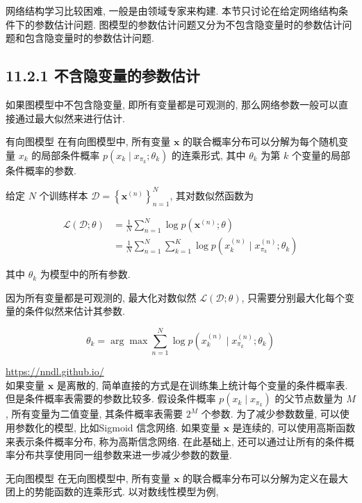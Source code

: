 \documentclass[10pt]{article}
\begin{document}
网络结构学习比较困难, 一般是由领域专家来构建. 本节只讨论在给定网络结构条件下的参数估计问题. 图模型的参数估计问题又分为不包含隐变量时的参数估计问题和包含隐变量时的参数估计问题.

\subsection*{11.2.1 不含隐变量的参数估计}
如果图模型中不包含隐变量, 即所有变量都是可观测的, 那么网络参数一般可以直接通过最大似然来进行估计.

有向图模型 在有向图模型中, 所有变量 $\boldsymbol{x}$ 的联合概率分布可以分解为每个随机变量 $x_{k}$ 的局部条件概率 $p\left(x_{k} \mid x_{\pi_{k}} ; \theta_{k}\right)$ 的连乘形式, 其中 $\theta_{k}$ 为第 $k$ 个变量的局部条件概率的参数.

给定 $N$ 个训练样本 $\mathcal{D}=\left\{\boldsymbol{x}^{(n)}\right\}_{n=1}^{N}$, 其对数似然函数为


\begin{align*}
\mathcal{L}(\mathcal{D} ; \theta) & =\frac{1}{N} \sum_{n=1}^{N} \log p\left(\boldsymbol{x}^{(n)} ; \theta\right)  \tag{11.27}\\
& =\frac{1}{N} \sum_{n=1}^{N} \sum_{k=1}^{K} \log p\left(x_{k}^{(n)} \mid x_{\pi_{k}}^{(n)} ; \theta_{k}\right) \tag{11.28}
\end{align*}


其中 $\theta_{k}$ 为模型中的所有参数.

因为所有变量都是可观测的, 最大化对数似然 $\mathcal{L}(\mathcal{D} ; \theta)$, 只需要分别最大化每个变量的条件似然来估计其参数.


\begin{equation*}
\theta_{k}=\arg \max \sum_{n=1}^{N} \log p\left(x_{k}^{(n)} \mid x_{\pi_{k}}^{(n)} ; \theta_{k}\right) \tag{11.29}
\end{equation*}


\href{https://nndl.github.io/}{https://nndl.github.io/}\\
如果变量 $\boldsymbol{x}$ 是离散的, 简单直接的方式是在训练集上统计每个变量的条件概率表. 但是条件概率表需要的参数比较多. 假设条件概率 $p\left(x_{k} \mid x_{\pi_{k}}\right)$ 的父节点数量为 $M$, 所有变量为二值变量, 其条件概率表需要 $2^{M}$ 个参数. 为了减少参数数量, 可以使用参数化的模型, 比如Sigmoid 信念网络. 如果变量 $\boldsymbol{x}$ 是连续的, 可以使用高斯函数来表示条件概率分布, 称为高斯信念网络. 在此基础上, 还可以通过让所有的条件概率分布共享使用同一组参数来进一步减少参数的数量.

无向图模型 在无向图模型中, 所有变量 $\boldsymbol{x}$ 的联合概率分布可以分解为定义在最大团上的势能函数的连乘形式. 以对数线性模型为例,
\end{document}
